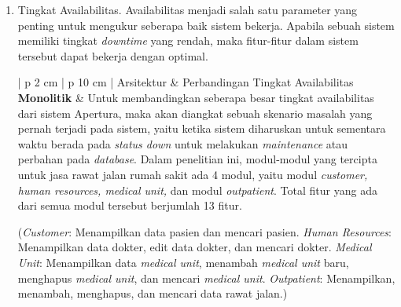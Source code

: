 \begin{enumerate}[leftmargin=*]
\begin{table}[H]
\begin{adjustbox}{width=1\textwidth}
\begin{tabular}{| p {2 cm} | p {10 cm} |}
				Namun kelemahan model ini adalah lebih sulit untuk melakukan \textit{join} data dengan service lain. Solusi untuk dapat menangani kelemahan ini adalah melakukan join pada level \textit{programming}, dimana data hasil \textit{response} di load pada sistem, kemudian melakukan \textit{in-memory join}. \textit{In-memory join} tidak akan lebih cepat dari metode \textit{query} langsung pada database seperti di model monolitik, namun selisih waktu yang dihasilkan tidak terlampau jauh sehingga metode ini dapat dijadikan solusi yang baik.\\
				\hline
			\end{tabular}
		\end{adjustbox}
	\end{table}
	\item Tingkat Availabilitas. Availabilitas menjadi salah satu parameter yang penting untuk mengukur seberapa baik sistem bekerja. Apabila sebuah sistem memiliki tingkat \textit{downtime} yang rendah, maka fitur-fitur dalam sistem tersebut dapat bekerja dengan optimal.
	\begin{table}[H]
		\small
		\begin{adjustbox}{width=1\textwidth}
			\begin{tabular}{| p {2 cm} | p {10 cm} |}
				\hline
				Arsitektur & Perbandingan Tingkat Availabilitas\\
				\hline
				\textbf{Monolitik} & Untuk membandingkan seberapa besar tingkat availabilitas dari sistem Apertura, maka akan diangkat sebuah skenario masalah yang pernah terjadi pada sistem, yaitu ketika sistem diharuskan untuk sementara waktu berada pada \textit{status down} untuk melakukan \textit{maintenance} atau perbahan pada \textit{database}. Dalam penelitian ini, modul-modul yang tercipta untuk jasa rawat jalan rumah sakit ada 4 modul, yaitu modul \textit{customer, human resources, medical unit,} dan modul \textit{outpatient}. Total fitur yang ada dari semua modul tersebut berjumlah 13 fitur.
				
				(\textit{Customer}: Menampilkan data pasien dan mencari pasien. \textit{Human Resources}: Menampilkan data dokter, edit data dokter, dan mencari dokter. \textit{Medical Unit}: Menampilkan data \textit{medical unit}, menambah \textit{medical unit} baru, menghapus \textit{medical unit}, dan mencari \textit{medical unit}. \textit{Outpatient}: Menampilkan, menambah, menghapus, dan mencari data rawat jalan.)
				

\end{tabular}
\end{adjustbox}
\end{table}
\end{enumerate}
